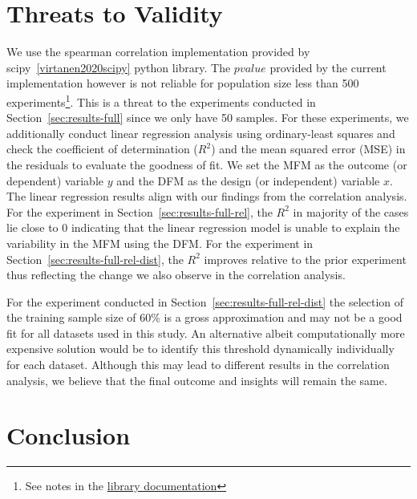 \documentclass{article}
\begin{document}
\section{Threats to Validity}\label{sec:threats}

We use the spearman correlation implementation provided by
scipy \ref{virtanen2020scipy} python library. The $pvalue$ provided by
the current implementation however is not reliable for population size
less than 500 experiments\footnote{See notes in the
\href{https://docs.scipy.org/doc/scipy/reference/generated/scipy.stats.spearmanr.html}{library
  documentation}}. This is a threat to the experiments conducted in
Section \ref{sec:results-full} since we only have 50 samples. For
these experiments, we additionally conduct linear regression analysis
using ordinary-least squares and check the coefficient of
determination ($R^2$) and the mean squared error (MSE) in the
residuals to evaluate the goodness of fit. We set the MFM as the
outcome (or dependent) variable $y$ and the DFM as the design (or
independent) variable $x$. The linear regression results align with
our findings from the correlation analysis. For the experiment in
Section \ref{sec:results-full-rel}, the $R^2$ in majority of the cases
lie close to 0 indicating that the linear regression model is unable
to explain the variability in the MFM using the DFM. For the
experiment in Section \ref{sec:results-full-rel-dist}, the $R^2$
improves relative to the prior experiment thus reflecting the change
we also observe in the correlation analysis.



For the experiment conducted in
Section \ref{sec:results-full-rel-dist} the selection of the training
sample size of 60\% is a gross approximation and may not be a good fit
for all datasets used in this study. An alternative albeit
computationally more expensive solution would be to identify this
threshold dynamically individually for each dataset. Although this may
lead to different results in the correlation analysis, we believe that
the final outcome and insights will remain the same.

\section{Conclusion}\label{sec:conclude}



\end{document}

